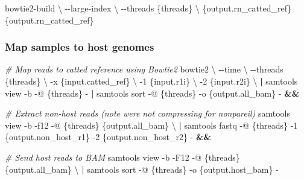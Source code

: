 \documentclass[
]{book}
\newenvironment{Shaded}{\begin{snugshade}}{\end{snugshade}}
\newcommand{\AttributeTok}[1]{\textcolor[rgb]{0.77,0.63,0.00}{#1}}
\newcommand{\CommentTok}[1]{\textcolor[rgb]{0.56,0.35,0.01}{\textit{#1}}}
\newcommand{\DataTypeTok}[1]{\textcolor[rgb]{0.13,0.29,0.53}{#1}}
\newcommand{\ExtensionTok}[1]{#1}
\newcommand{\KeywordTok}[1]{\textcolor[rgb]{0.13,0.29,0.53}{\textbf{#1}}}
\newcommand{\NormalTok}[1]{#1}
\begin{document}
\begin{Shaded}
\begin{Highlighting}[]
\ExtensionTok{bowtie2{-}build} \DataTypeTok{\textbackslash{}}
    \AttributeTok{{-}{-}large{-}index} \DataTypeTok{\textbackslash{}}
    \AttributeTok{{-}{-}threads}\NormalTok{ \{threads\} }\DataTypeTok{\textbackslash{}}
\NormalTok{        \{output.rn\_catted\_ref\} \{output.rn\_catted\_ref\}}
\end{Highlighting}
\end{Shaded}

\hypertarget{map-samples-to-host-genomes}{%
\subsubsection*{Map samples to host genomes}\label{map-samples-to-host-genomes}}

\begin{Shaded}
\begin{Highlighting}[]
\CommentTok{\# Map reads to catted reference using Bowtie2}
\ExtensionTok{bowtie2} \DataTypeTok{\textbackslash{}}
    \AttributeTok{{-}{-}time} \DataTypeTok{\textbackslash{}}
    \AttributeTok{{-}{-}threads}\NormalTok{ \{threads\} }\DataTypeTok{\textbackslash{}}
    \AttributeTok{{-}x}\NormalTok{ \{input.catted\_ref\} }\DataTypeTok{\textbackslash{}}
    \AttributeTok{{-}1}\NormalTok{ \{input.r1i\} }\DataTypeTok{\textbackslash{}}
    \AttributeTok{{-}2}\NormalTok{ \{input.r2i\} }\DataTypeTok{\textbackslash{}}
\KeywordTok{|} \ExtensionTok{samtools}\NormalTok{ view }\AttributeTok{{-}b} \AttributeTok{{-}@}\NormalTok{ \{threads\} }\AttributeTok{{-}} \KeywordTok{|} \ExtensionTok{samtools}\NormalTok{ sort }\AttributeTok{{-}@}\NormalTok{ \{threads\} }\AttributeTok{{-}o}\NormalTok{ \{output.all\_bam\} }\AttributeTok{{-}} \KeywordTok{\&\&}

\CommentTok{\# Extract non{-}host reads (note we\textquotesingle{}re not compressing for nonpareil)}
\ExtensionTok{samtools}\NormalTok{ view }\AttributeTok{{-}b} \AttributeTok{{-}f12} \AttributeTok{{-}@}\NormalTok{ \{threads\} \{output.all\_bam\} }\DataTypeTok{\textbackslash{}}
\KeywordTok{|} \ExtensionTok{samtools}\NormalTok{ fastq }\AttributeTok{{-}@}\NormalTok{ \{threads\} }\AttributeTok{{-}1}\NormalTok{ \{output.non\_host\_r1\} }\AttributeTok{{-}2}\NormalTok{ \{output.non\_host\_r2\} }\AttributeTok{{-}} \KeywordTok{\&\&}

\CommentTok{\# Send host reads to BAM}
\ExtensionTok{samtools}\NormalTok{ view }\AttributeTok{{-}b} \AttributeTok{{-}F12} \AttributeTok{{-}@}\NormalTok{ \{threads\} \{output.all\_bam\} }\DataTypeTok{\textbackslash{}}
\KeywordTok{|} \ExtensionTok{samtools}\NormalTok{ sort }\AttributeTok{{-}@}\NormalTok{ \{threads\} }\AttributeTok{{-}o}\NormalTok{ \{output.host\_bam\} }\AttributeTok{{-}}
\end{Highlighting}
\end{Shaded}
\end{document}
